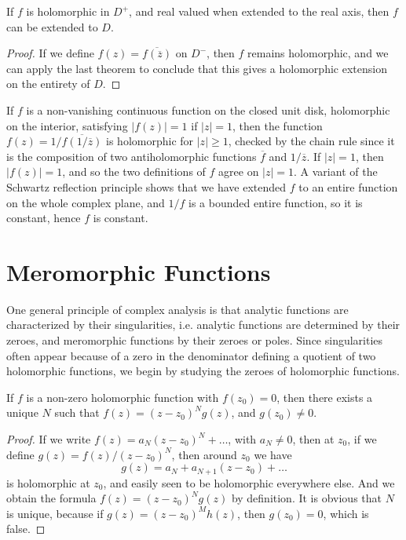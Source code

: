 \begin{theorem}
    If $f$ is holomorphic in $D^+$, and real valued when extended to the real axis, then $f$ can be extended to $D$.
\end{theorem}
\begin{proof}
    If we define $f(z) = \overline{f(\overline{z})}$ on $D^-$, then $f$ remains holomorphic, and we can apply the last theorem to conclude that this gives a holomorphic extension on the entirety of $D$.
\end{proof}

If $f$ is a non-vanishing continuous function on the closed unit disk, holomorphic on the interior, satisfying $|f(z)| = 1$ if $|z| = 1$, then the function $f(z) = 1/\overline{f(1/\overline{z})}$ is holomorphic for $|z| \geq 1$, checked by the chain rule since it is the composition of two antiholomorphic functions $\overline{f}$ and $1/\overline{z}$. If $|z| = 1$, then $|f(z)| = 1$, and so the two definitions of $f$ agree on $|z| = 1$. A variant of the Schwartz reflection principle shows that we have extended $f$ to an entire function on the whole complex plane, and $1/f$ is a bounded entire function, so it is constant, hence $f$ is constant.

\chapter{Meromorphic Functions}

One general principle of complex analysis is that analytic functions are characterized by their singularities, i.e. analytic functions are determined by their zeroes, and meromorphic functions by their zeroes or poles. Since singularities often appear because of a zero in the denominator defining a quotient of two holomorphic functions, we begin by studying the zeroes of holomorphic functions.

\begin{theorem}
    If $f$ is a non-zero holomorphic function with $f(z_0) = 0$, then there exists a unique $N$ such that $f(z) = (z - z_0)^N g(z)$, and $g(z_0) \neq 0$.
\end{theorem}
\begin{proof}
    If we write $f(z) = a_N (z - z_0)^N + \dots$, with $a_N \neq 0$, then at $z_0$, if we define $g(z) = f(z)/(z - z_0)^N$, then around $z_0$ we have
    \[ g(z) = a_N + a_{N+1} (z - z_0) + \dots \]
    is holomorphic at $z_0$, and easily seen to be holomorphic everywhere else. And we obtain the formula $f(z) = (z - z_0)^N g(z)$ by definition. It is obvious that $N$ is unique, because if $g(z) = (z - z_0)^M h(z)$, then $g(z_0) = 0$, which is false.
\end{proof}

